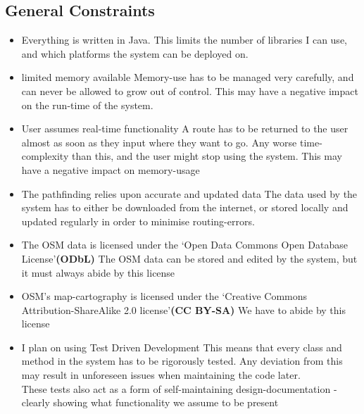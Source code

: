\documentclass[conference]{IEEEtran}
\begin{document}
\clearpage
\subsection{General Constraints}
\begin{itemize}
	\item Everything is written in Java.
	\subitem This limits the number of libraries I can use, and which platforms the system can be deployed on.
	\item limited memory available
	\subitem Memory-use has to be managed very carefully, and can never be allowed to grow out of control.
	\subsubitem This may have a negative impact on the run-time of the system.
	\item User assumes real-time functionality
	\subitem A route has to be returned to the user almost as soon as they input where they want to go. Any worse time-complexity than this, and the user might stop using the system.
	\subsubitem This may have a negative impact on memory-usage
	\item The pathfinding relies upon accurate and updated data
	\subitem The data used by the system has to either be downloaded from the internet, or stored locally and updated regularly in order to minimise routing-errors.
	\item The OSM data is licensed under the \textquoteleft Open Data Commons Open Database License\textquoteright \space \textbf{(ODbL)}
	\subitem The OSM data can be stored and edited by the system, but it must always abide by this license
	\item OSM's map-cartography is licensed under the \textquoteleft Creative Commons Attribution-ShareAlike 2.0 license\textquoteright \space \textbf{(CC BY-SA)}
	\subitem We have to abide by this license
	\item I plan on using Test Driven Development
	\subitem This means that every class and method in the system has to be rigorously tested. Any deviation from this may result in unforeseen issues when maintaining the code later.\\These tests also act as a form of self-maintaining design-documentation - clearly showing what functionality we assume to be present
\end{itemize}
\end{document}
